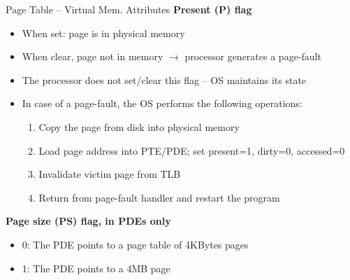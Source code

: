 \documentclass[aspectratio=169,12pt]{beamer}
\begin{document}
\begin{frame}{Page Table – Virtual Mem. Attributes}
\textbf{Present (P) flag}
\begin{itemize}
\item When set: page is in physical memory
\item When clear, page not in memory $\rightarrow$ processor generates a page-fault
\item The processor does not set/clear this flag – OS maintains its state
\item In case of a page-fault, the OS performs the following operations:
    \begin{enumerate}
    \item Copy the page from disk into physical memory
    \item Load page address into PTE/PDE; set present=1, dirty=0, accessed=0
    \item Invalidate victim page from TLB
    \item Return from page-fault handler and restart the program
    \end{enumerate}
\end{itemize}

\textbf{Page size (PS) flag, in PDEs only}
\begin{itemize}
\item 0: The PDE points to a page table of 4KBytes pages
\item 1: The PDE points to a 4MB page
\end{itemize}
\end{frame}
\end{document}
